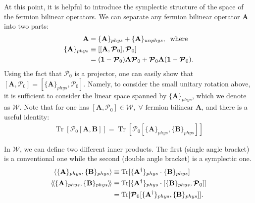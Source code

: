 \begin{subappendices}
    At this point, it is helpful to introduce the symplectic structure of the space of the fermion bilinear operators. We can separate any fermion bilinear operator $\mathbf A$ into two parts:
    \begin{align}
        \mathbf A            & =\{\mathbf A\}_{phys}+\{\mathbf A\}_{unphys},\;\;\text{where}\notag                                                                               \\
        \{\mathbf A\}_{phys} & \equiv [[\mathbf A,\boldsymbol{\mathcal P}_0],\boldsymbol{\mathcal P}_0]\notag                                                                    \\
                             & =(\mathbf 1-\boldsymbol{\mathcal P}_0)\mathbf A\boldsymbol{\mathcal P}_0+\boldsymbol{\mathcal P}_0\mathbf A(\mathbf 1-\boldsymbol{\mathcal P}_0).
    \end{align}
    Using the fact that $\boldsymbol{\mathcal P}_0$ is a projector, one can easily show that $[\mathbf A,\boldsymbol{\mathcal P}_0]=[\{\mathbf A\}_{phys},\boldsymbol{\mathcal P}_0]$. Namely, to consider the small unitary rotation above, it is sufficient to consider the linear space spanned by $\{\mathbf A\}_{phys}$, which we denote as $\boldsymbol{\mathcal W}$. Note that for one has $[\mathbf A,\boldsymbol{\mathcal P}_0]\in \boldsymbol{\mathcal W},\; \forall \text{ fermion bilinear } \mathbf A$, and there is a useful identity:
    \begin{align}
        \mathop{\mathrm{Tr}}[\boldsymbol{\mathcal P}_0[\mathbf A,\mathbf B]]=\mathop{\mathrm{Tr}}[\boldsymbol{\mathcal P}_0[\{\mathbf A\}_{phys},\{\mathbf B\}_{phys}]]
    \end{align}

    In $\boldsymbol{\mathcal W}$, we can define two different inner products. The first (single angle bracket) is a conventional one while the second (double angle bracket) is a symplectic one.
    \begin{align}
        \langle \{\mathbf A\}_{phys},\{\mathbf B\}_{phys}\rangle  & \equiv\mathop{\mathrm{Tr}}[ \{\mathbf A^\dagger\}_{phys}\cdot \{\mathbf B\}_{phys}]\notag                              \\
        \langle\!\langle\{\mathbf A\}_{phys},\{\mathbf B\}_{phys}\rangle\!\rangle & \equiv\mathop{\mathrm{Tr}}[ \{\mathbf A^\dagger\}_{phys}\cdot [ \{\mathbf B\}_{phys},\boldsymbol{\mathcal P}_0]]\notag \\
                                                                  & =\mathop{\mathrm{Tr}}[\boldsymbol{\mathcal P}_0 [ \{\mathbf A^\dagger\}_{phys},\{\mathbf B\}_{phys}]].
    \end{align}


\end{subappendices}
